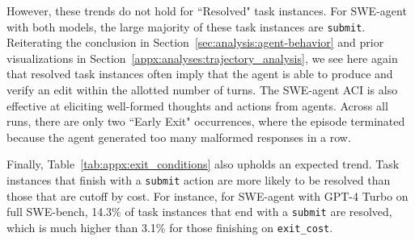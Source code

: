 However, these trends do not hold for ``Resolved" task instances.
For SWE-agent with both models, the large majority of these task instances are \texttt{submit}.
Reiterating the conclusion in Section~\ref{sec:analysis:agent-behavior} and prior visualizations in Section~\ref{appx:analyses:trajectory_analysis}, we see here again that resolved task instances often imply that the agent is able to produce and verify an edit within the allotted number of turns.
The SWE-agent ACI is also effective at eliciting well-formed thoughts and actions from agents.
Across all runs, there are only two ``Early Exit" occurrences, where the episode terminated because the agent generated too many malformed responses in a row.

Finally, Table~\ref{tab:appx:exit_conditions} also upholds an expected trend.
Task instances that finish with a \texttt{submit} action are more likely to be resolved than those that are cutoff by cost.
For instance, for SWE-agent with GPT-4 Turbo on full SWE-bench, \num{14.3}\% of task instances that end with a \texttt{submit} are resolved, which is much higher than \num{3.1}\% for those finishing on \texttt{exit\_cost}.
